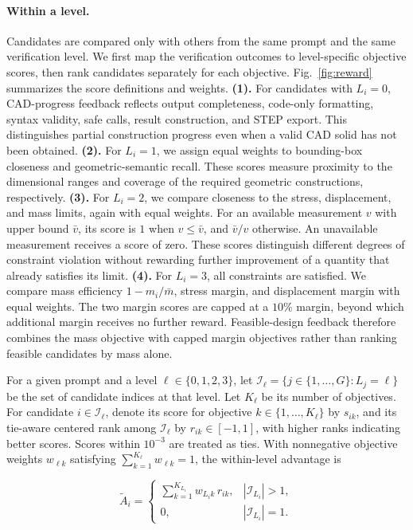 \paragraph{Within a level.}
Candidates are compared only with others from the same prompt and the same verification level. We first map the verification outcomes to level-specific objective scores, then rank candidates separately for each objective. Fig.~\ref{fig:reward} summarizes the score definitions and weights.
\textbf{(1).} For candidates with \(L_i=0\), CAD-progress feedback reflects output completeness, code-only formatting, syntax validity, safe calls, result construction, and STEP export. This distinguishes partial construction progress even when a valid CAD solid has not been obtained.
\textbf{(2).}  For \(L_i=1\), we assign equal weights to bounding-box closeness and geometric-semantic recall. These scores measure proximity to the dimensional ranges and coverage of the required geometric constructions, respectively.
\textbf{(3).}  For \(L_i=2\), we compare closeness to the stress, displacement, and mass limits, again with equal weights. For an available measurement \(v\) with upper bound \(\bar v\), its score is \(1\) when \(v\leq\bar v\), and \(\bar v/v\) otherwise. An unavailable measurement receives a score of zero. These scores distinguish different degrees of constraint violation without rewarding further improvement of a quantity that already satisfies its limit.
\textbf{(4).}  For \(L_i=3\), all constraints are satisfied. We compare mass efficiency \(1-m_i/\bar m\), stress margin, and displacement margin with equal weights. The two margin scores are capped at a \(10\%\) margin, beyond which additional margin receives no further reward. Feasible-design feedback therefore combines the mass objective with capped margin objectives rather than ranking feasible candidates by mass alone.


For a given prompt and a level \(\ell\in\{0,1,2,3\}\), let \(\mathcal I_\ell=\{j\in\{1,\ldots,G\}:L_j=\ell\}\) be the set of candidate indices at that level. Let \(K_\ell\) be its number of objectives. For candidate \(i\in\mathcal I_\ell\), denote its score for objective \(k\in\{1,\ldots,K_\ell\}\) by \(s_{ik}\), and its tie-aware centered rank among \(\mathcal I_\ell\) by \(r_{ik}\in[-1,1]\), with higher ranks indicating better scores. Scores within \(10^{-3}\) are treated as ties. With nonnegative objective weights \(w_{\ell k}\) satisfying \(\sum_{k=1}^{K_\ell}w_{\ell k}=1\), the within-level advantage is

\begin{equation}
\widetilde A_i=
\begin{cases}
\displaystyle\sum_{k=1}^{K_{L_i}}w_{L_i k}\,r_{ik},
& |\mathcal I_{L_i}|>1,\\[2mm]
0, & |\mathcal I_{L_i}|=1.
\end{cases}
\label{eq:peer_rank}
\end{equation}

